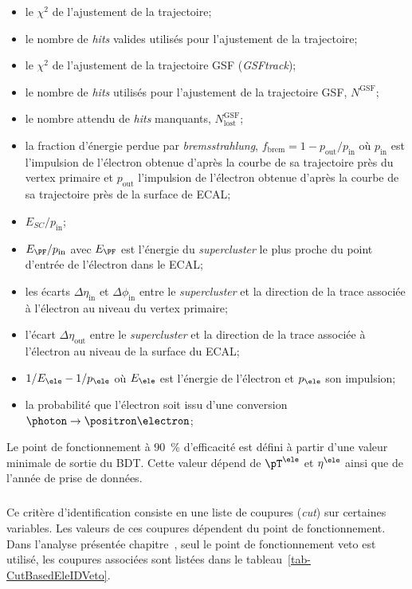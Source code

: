\begin{itemize}
\item le $\chi^2$ de l'ajustement de la trajectoire;
\item le nombre de \emph{hits} valides utilisés pour l'ajustement de la trajectoire;
\item le $\chi^2$ de l'ajustement de la trajectoire GSF (\emph{GSFtrack});%
\item le nombre de \emph{hits} utilisés pour l'ajustement de la trajectoire GSF, $N^\text{GSF}$;
\item le nombre attendu de \emph{hits} manquants, $N_\text{lost}^\text{GSF}$;
\item la fraction d'énergie perdue par \emph{bremsstrahlung}, $f_\text{brem} = 1-p_\text{out}/p_\text{in}$ où
$p_\text{in}$ est l'impulsion de l'électron obtenue d'après la courbe de sa trajectoire près du vertex primaire et
$p_\text{out}$ l'impulsion de l'électron obtenue d'après la courbe de sa trajectoire près de la surface de ECAL;

\item $E_{SC}/p_\text{in}$;
\item $E_{\PF}/p_\text{in}$ avec $E_{\PF}$ est l'énergie du \emph{supercluster} le plus proche du point d'entrée de l'électron dans le ECAL;
\item les écarts $\Delta\eta_\text{in}$ et $\Delta\phi_\text{in}$ entre le \emph{supercluster} et la direction de la trace associée à l'électron au niveau du vertex primaire;
\item l'écart $\Delta\eta_\text{out}$ entre le \emph{supercluster} et la direction de la trace associée à l'électron au niveau de la surface du ECAL;
\item $1/E_{\ele}-1/p_{\ele}$ où $E_{\ele}$ est l'énergie de l'électron et $p_{\ele}$ son impulsion;

\item la probabilité que l'électron soit issu d'une conversion $\photon\to\positron\electron$;
\end{itemize}
\par
Le point de fonctionnement à \SI{90}{\%} d'efficacité est défini à partir d'une valeur minimale de sortie du BDT.
Cette valeur dépend de $\pT^{\ele}$ et $\eta^{\ele}$ ainsi que de l'année de prise de données.
\subparagraph{\CutBasedEleID}
Ce critère d'identification consiste en une liste de coupures (\emph{cut}) sur certaines variables.
Les valeurs de ces coupures dépendent du point de fonctionnement.
Dans l'analyse présentée chapitre~, seul le point de fonctionnement \og veto \fg{} est utilisé, les coupures associées sont listées dans le tableau~\ref{tab-CutBasedEleIDVeto}.
